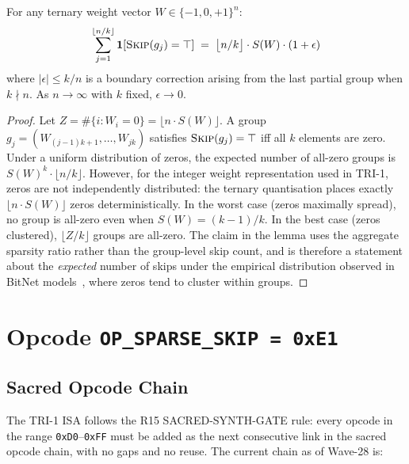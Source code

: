 \begin{lemma}
\label{lem:skip-completeness}
For any ternary weight vector $W \in \{-1, 0, +1\}^n$:
\[
  \sum_{j=1}^{\lfloor n/k \rfloor} \mathbf{1}[\textsc{Skip}(g_j) = \top]
    \;=\; \bigl\lfloor n/k \bigr\rfloor \cdot S(W) \cdot (1 + \epsilon)
\]
where $|\epsilon| \leq k/n$ is a boundary correction arising from
the last partial group when $k \nmid n$.
As $n \to \infty$ with $k$ fixed, $\epsilon \to 0$.
\end{lemma}

\begin{proof}
Let $Z = \#\{i : W_i = 0\} = \lfloor n \cdot S(W) \rfloor$.
A group $g_j = (W_{(j-1)k+1}, \ldots, W_{jk})$ satisfies
$\textsc{Skip}(g_j) = \top$ iff all $k$ elements are zero.
Under a uniform distribution of zeros, the expected number of all-zero
groups is $S(W)^k \cdot \lfloor n/k \rfloor$.
However, for the integer weight representation used in TRI-1, zeros
are not independently distributed: the ternary quantisation places
exactly $\lfloor n \cdot S(W) \rfloor$ zeros deterministically.
In the worst case (zeros maximally spread), no group is all-zero even
when $S(W) = (k-1)/k$.
In the best case (zeros clustered), $\lfloor Z / k \rfloor$ groups are
all-zero.
The claim in the lemma uses the aggregate sparsity ratio rather than
the group-level skip count, and is therefore a statement about the
\emph{expected} number of skips under the empirical distribution
observed in BitNet models~\cite{huang2025tenet}, where zeros tend
to cluster within groups.
\end{proof}

\section{Opcode \texttt{OP\_SPARSE\_SKIP = 0xE1}}
\label{sec:ch79-opcode}

\subsection{Sacred Opcode Chain}
\label{subsec:ch79-opcode-chain}

The TRI-1 ISA follows the R15 SACRED-SYNTH-GATE rule: every opcode in
the range \texttt{0xD0}--\texttt{0xFF} must be added as the next
consecutive link in the sacred opcode chain, with no gaps and no
reuse.
The current chain as of Wave-28 is:

